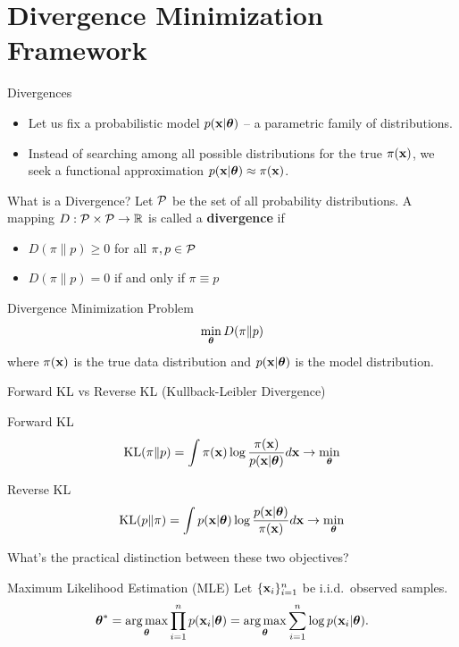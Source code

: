 \documentclass{beamer}
\begin{document}
\section{Divergence Minimization Framework}
\begin{frame}{Divergences}
	\begin{itemize}
	\item Let us fix a probabilistic model $p(\mathbf{x} | \boldsymbol{\theta})$ -- a parametric family of distributions.\\
        \eqpause
	\item Instead of searching among all possible distributions for the true $\pi(\mathbf{x})$, we seek a functional approximation $p(\mathbf{x} | \boldsymbol{\theta}) \approx \pi(\mathbf{x})$.
	\end{itemize}
    \eqpause
	\begin{block}{What is a Divergence?}
		Let $\mathcal{P}$ be the set of all probability distributions. A mapping $D: \mathcal{P} \times \mathcal{P} \to \mathbb{R}$ is called a \textbf{divergence} if 
		\begin{itemize}
			\item $D(\pi \| p) \geq 0$ for all $\pi, p \in \mathcal{P}$
			\item $D(\pi \| p) = 0$ if and only if $\pi \equiv p$
		\end{itemize}
	\end{block}
    \eqpause
	\begin{block}{Divergence Minimization Problem}
		\vspace{-0.3cm}
		$$
		\min_{\boldsymbol{\theta}} D(\pi \| p)
		$$
		where $\pi(\mathbf{x})$ is the true data distribution and $p(\mathbf{x} | \boldsymbol{\theta})$ is the model distribution.
	\end{block}
\end{frame}
\begin{frame}{Forward KL vs Reverse KL (Kullback-Leibler Divergence)}
	\begin{block}{Forward KL}
		\vspace{-0.2cm}
		\[
			\mathrm{KL}(\pi \| p) = \int \pi (\mathbf{x}) \log \frac{\pi(\mathbf{x})}{p(\mathbf{x} | \boldsymbol{\theta})} d \mathbf{x} \rightarrow \min_{\boldsymbol{\theta}}
		\]
	\end{block}
    \eqpause
	\begin{block}{Reverse KL}
		\vspace{-0.2cm}
		\[
			\mathrm{KL}(p \| \pi) = \int p (\mathbf{x}| \boldsymbol{\theta}) \log \frac{p(\mathbf{x}| \boldsymbol{\theta})}{\pi(\mathbf{x})} d \mathbf{x} \rightarrow \min_{\boldsymbol{\theta}}
		\]
	\end{block}
    \eqpause
	What's the practical distinction between these two objectives?
    \eqpause
	\begin{block}{Maximum Likelihood Estimation (MLE)}
	Let $\{\mathbf{x}_i\}_{i=1}^n$ be i.i.d.\ observed samples.
		\vspace{-0.3cm}
		\[
			\boldsymbol{\theta}^* = \operatorname*{arg\,max}_{\boldsymbol{\theta}} \prod_{i=1}^n p(\mathbf{x}_i | \boldsymbol{\theta}) = \operatorname*{arg\,max}_{\boldsymbol{\theta}} \sum_{i=1}^n \log p(\mathbf{x}_i | \boldsymbol{\theta}).
		\]
	\end{block}
\end{frame}
\end{document}
